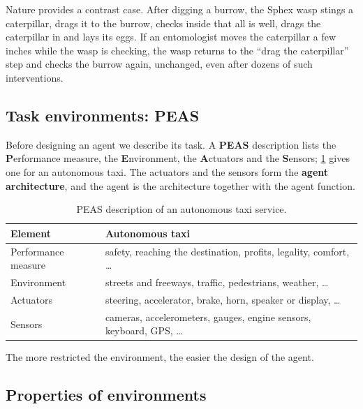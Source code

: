 \begin{example}\label{ex:sphex}
  Nature provides a contrast case. After digging a burrow, the Sphex wasp
  stings a caterpillar, drags it to the burrow, checks inside that all is well,
  drags the caterpillar in and lays its eggs. If an entomologist moves the
  caterpillar a few inches while the wasp is checking, the wasp returns to the
  ``drag the caterpillar'' step and checks the burrow again, unchanged, even
  after dozens of such interventions.
\end{example}

\subsection{Task environments: PEAS}\label{sec:agents-peas}

Before designing an agent we describe its task. A \textbf{PEAS} description
lists the \textbf{P}erformance measure, the \textbf{E}nvironment, the
\textbf{A}ctuators and the \textbf{S}ensors; \cref{tab:peas-taxi} gives one
for an autonomous taxi. The actuators and the sensors form the \textbf{agent
architecture}, and the agent is the architecture together with the agent
function.

\begin{table}[htbp]
  \centering
  \renewcommand{\arraystretch}{1.08}
  \caption{PEAS description of an autonomous taxi service.}\label{tab:peas-taxi}
  \begin{tabularx}{\linewidth}{@{}lX@{}}
    \toprule
    \textbf{Element} & \textbf{Autonomous taxi} \\
    \midrule
    Performance measure & safety, reaching the destination, profits, legality,
      comfort, \dots \\
    Environment & streets and freeways, traffic, pedestrians, weather, \dots \\
    Actuators & steering, accelerator, brake, horn, speaker or display, \dots \\
    Sensors & cameras, accelerometers, gauges, engine sensors, keyboard,
      GPS, \dots \\
    \bottomrule
  \end{tabularx}
\end{table}

The more restricted the environment, the easier the design of the agent.

\subsection{Properties of environments}\label{sec:agents-properties}

